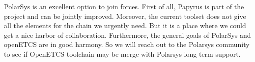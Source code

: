 
 PolarSys is an excellent option to join forces.  First of all,
 Papyrus is part of the project and can be jointly improved.
 Moreover, the current toolset does not give all the elements for the
 chain we urgently need. But it is a place where we could get 
 a nice harbor of collaboration. Furthermore,
 the general goals of PolarSys and openETCS are in good harmony. 
So we will reach out to the Polarsys
 community to see if  OpenETCS toolchain  may be merge with Polarsys
 long term support. 
 

